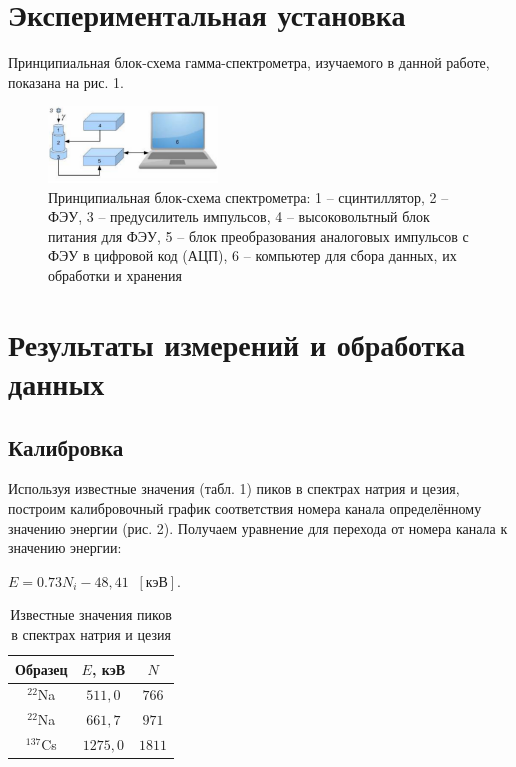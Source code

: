 \documentclass[a4paper]{article}
\begin{document}
\section{Экспериментальная установка}

Принципиальная блок-схема гамма-спектрометра, изучаемого в данной работе, показана на рис. 1.

\begin{figure}[!ht]
    \begin{center}
        \includegraphics[width = 0.40\textwidth]{image/pic1.png}
        \caption{Принципиальная блок-схема спектрометра: 1 -- сцинтиллятор, 2 -- ФЭУ, 3 -- предусилитель импульсов, 4 -- высоковольтный блок питания для ФЭУ, 5 -- блок преобразования аналоговых импульсов с ФЭУ в цифровой код (АЦП), 6 -- компьютер для сбора данных, их обработки и хранения}
    \end{center}
\end{figure}

\section{Результаты измерений и обработка данных}

\subsection {Калибровка}

\noindent Используя известные значения (табл. 1) пиков в спектрах натрия и цезия, построим калибровочный график соответствия номера канала определённому значению энергии (рис. 2). Получаем уравнение для перехода от номера канала к значению энергии:
\begin{center}
    $E = 0.73N_i - 48,41 \;\; [\text{кэВ}].$
\end{center}

\begin{table}[!ht]
    \centering
    \caption{Известные значения пиков в спектрах натрия и цезия}
    \begin{tabular}{|c|c|c|}
    \hline
    Образец & $E$, кэВ & $N$    \\ \hline
    $^{22}$Na      & $511,0$    & $766$  \\ \hline
    $^{22}$Na      & $661,7$  & $971$  \\ \hline
    $^{137}$Cs      & $1275,0$   & $1811$ \\ \hline
    \end{tabular}
    \end{table}
\end{document}
